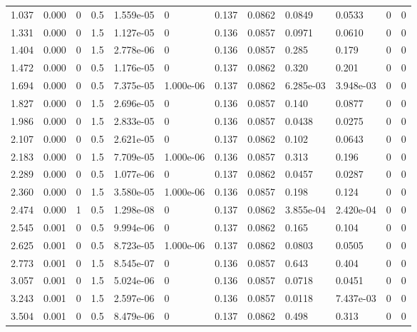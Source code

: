\documentclass[preview]{standalone}
\begin{document}
{{\begin{tabular}{L{1.2cm}C{1.2cm} C{0.3cm}C{0.5cm} C{1.4cm}C{1.4cm} C{1.4cm}C{1.4cm} C{1.6cm}C{1.6cm} C{1.6cm}C{1.6cm}}
  1.037  &  0.000  & 0     & 0.5 &  1.559e-05  & 0  &  0.137&   0.0862& 0.0849 & 0.0533   &  0 & 0  \\ 
  1.331  &  0.000  & 0     & 1.5 &  1.127e-05  & 0  &  0.136&   0.0857& 0.0971 & 0.0610   &  0 & 0  \\ 
  1.404  &  0.000  & 0     & 1.5 &  2.778e-06  & 0  &  0.136&   0.0857& 0.285 & 0.179   &  0 & 0  \\ 
  1.472  &  0.000  & 0     & 0.5 &  1.176e-05  & 0  &  0.137&   0.0862& 0.320 & 0.201   &  0 & 0  \\ 
  1.694  &  0.000  & 0     & 0.5 &  7.375e-05  & 1.000e-06  &  0.137&   0.0862& 6.285e-03 & 3.948e-03   &  0 & 0  \\ 
  1.827  &  0.000  & 0     & 1.5 &  2.696e-05  & 0  &  0.136&   0.0857& 0.140 & 0.0877   &  0 & 0  \\ 
  1.986  &  0.000  & 0     & 1.5 &  2.833e-05  & 0  &  0.136&   0.0857& 0.0438 & 0.0275   &  0 & 0  \\ 
  2.107  &  0.000  & 0     & 0.5 &  2.621e-05  & 0  &  0.137&   0.0862& 0.102 & 0.0643   &  0 & 0  \\ 
  2.183  &  0.000  & 0     & 1.5 &  7.709e-05  & 1.000e-06  &  0.136&   0.0857& 0.313 & 0.196   &  0 & 0  \\ 
  2.289  &  0.000  & 0     & 0.5 &  1.077e-06  & 0  &  0.137&   0.0862& 0.0457 & 0.0287   &  0 & 0  \\ 
  2.360  &  0.000  & 0     & 1.5 &  3.580e-05  & 1.000e-06  &  0.136&   0.0857& 0.198 & 0.124   &  0 & 0  \\ 
  2.474  &  0.000  & 1     & 0.5 &  1.298e-08  & 0  &  0.137&   0.0862& 3.855e-04 & 2.420e-04   &  0 & 0  \\ 
  2.545  &  0.001  & 0     & 0.5 &  9.994e-06  & 0  &  0.137&   0.0862& 0.165 & 0.104   &  0 & 0  \\ 
  2.625  &  0.001  & 0     & 0.5 &  8.723e-05  & 1.000e-06  &  0.137&   0.0862& 0.0803 & 0.0505   &  0 & 0  \\ 
  2.773  &  0.001  & 0     & 1.5 &  8.545e-07  & 0  &  0.136&   0.0857& 0.643 & 0.404   &  0 & 0  \\ 
  3.057  &  0.001  & 0     & 1.5 &  5.024e-06  & 0  &  0.136&   0.0857& 0.0718 & 0.0451   &  0 & 0  \\ 
  3.243  &  0.001  & 0     & 1.5 &  2.597e-06  & 0  &  0.136&   0.0857& 0.0118 & 7.437e-03   &  0 & 0  \\ 
  3.504  &  0.001  & 0     & 0.5 &  8.479e-06  & 0  &  0.137&   0.0862& 0.498 & 0.313   &  0 & 0  \\ 

\end{tabular}}}
\end{document}
